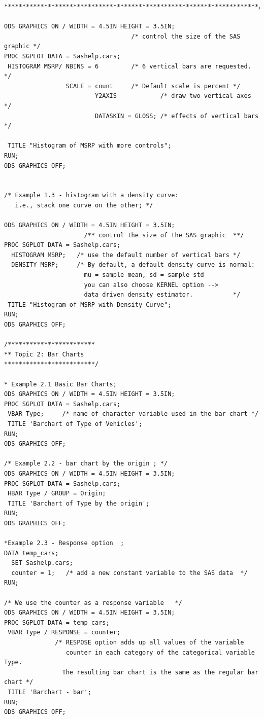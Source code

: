 \documentclass[
]{book}
\begin{document}
\begin{verbatim}
**********************************************************************/

ODS GRAPHICS ON / WIDTH = 4.5IN HEIGHT = 3.5IN;  
                                   /* control the size of the SAS graphic */
PROC SGPLOT DATA = Sashelp.cars;
 HISTOGRAM MSRP/ NBINS = 6         /* 6 vertical bars are requested. */
                 SCALE = count     /* Default scale is percent */
                         Y2AXIS            /* draw two vertical axes */
                         DATASKIN = GLOSS; /* effects of vertical bars */
                                
 TITLE "Histogram of MSRP with more controls";
RUN; 
ODS GRAPHICS OFF;


/* Example 1.3 - histogram with a density curve: 
   i.e., stack one curve on the other; */
   
ODS GRAPHICS ON / WIDTH = 4.5IN HEIGHT = 3.5IN;   
                      /** control the size of the SAS graphic  **/
PROC SGPLOT DATA = Sashelp.cars;
  HISTOGRAM MSRP;   /* use the default number of vertical bars */
  DENSITY MSRP;     /* By default, a default density curve is normal: 
                      mu = sample mean, sd = sample std 
                      you can also choose KERNEL option --> 
                      data driven density estimator.           */
 TITLE "Histogram of MSRP with Density Curve";
RUN; 
ODS GRAPHICS OFF;

/************************
** Topic 2: Bar Charts
*************************/

* Example 2.1 Basic Bar Charts;
ODS GRAPHICS ON / WIDTH = 4.5IN HEIGHT = 3.5IN;    
PROC SGPLOT DATA = Sashelp.cars;
 VBAR Type;     /* name of character variable used in the bar chart */        
 TITLE 'Barchart of Type of Vehicles';
RUN;
ODS GRAPHICS OFF;

/* Example 2.2 - bar chart by the origin ; */
ODS GRAPHICS ON / WIDTH = 4.5IN HEIGHT = 3.5IN;  
PROC SGPLOT DATA = Sashelp.cars;
 HBAR Type / GROUP = Origin;
 TITLE 'Barchart of Type by the origin';
RUN; 
ODS GRAPHICS OFF;

*Example 2.3 - Response option  ;
DATA temp_cars;
  SET Sashelp.cars;
  counter = 1;   /* add a new constant variable to the SAS data  */
RUN;

/* We use the counter as a response variable   */
ODS GRAPHICS ON / WIDTH = 4.5IN HEIGHT = 3.5IN;
PROC SGPLOT DATA = temp_cars;
 VBAR Type / RESPONSE = counter;
              /* RESPOSE option adds up all values of the variable 
                 counter in each category of the categorical variable Type. 
                The resulting bar chart is the same as the regular bar chart */
 TITLE 'Barchart - bar';
RUN; 
ODS GRAPHICS OFF;


\end{verbatim}
\end{document}
